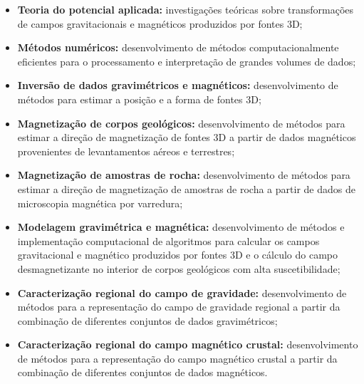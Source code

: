 \begin{itemize}
	
	\item[\parbox{0.03\textwidth}{\vspace{-0.1\baselineskip}\faSearch}] 
	{\textbf{Teoria do potencial aplicada:} investigações teóricas sobre transformações de campos gravitacionais e magnéticos produzidos por fontes 3D;}
	
	\item[\parbox{0.03\textwidth}{\vspace{-0.1\baselineskip}\faSearch}] 
	{\textbf{Métodos numéricos:} desenvolvimento de métodos computacionalmente eficientes para o processamento e interpretação de grandes volumes de dados;}
	
	\item[\parbox{0.03\textwidth}{\vspace{-0.1\baselineskip}\faSearch}] 
	{\textbf{Inversão de dados gravimétricos e magnéticos:} desenvolvimento de métodos para estimar a posição e a forma de fontes 3D;}
	
	\item[\parbox{0.03\textwidth}{\vspace{-0.1\baselineskip}\faSearch}] 
	{\textbf{Magnetização de corpos geológicos:} desenvolvimento de métodos para estimar a direção de magnetização de fontes 3D a partir de dados magnéticos provenientes de levantamentos aéreos e terrestres;}
	
	\item[\parbox{0.03\textwidth}{\vspace{-0.1\baselineskip}\faSearch}] 
	{\textbf{Magnetização de amostras de rocha:} desenvolvimento de métodos para estimar a direção de magnetização de amostras de rocha a partir de dados de microscopia magnética por varredura;}
	
	\item[\parbox{0.03\textwidth}{\vspace{-0.1\baselineskip}\faSearch}] 
	{\textbf{Modelagem gravimétrica e magnética:} desenvolvimento de métodos e implementação computacional de algoritmos para calcular os campos gravitacional e magnético produzidos por fontes 3D e o cálculo do campo desmagnetizante no interior de corpos geológicos com alta suscetibilidade;}
	
	\item[\parbox{0.03\textwidth}{\vspace{-0.1\baselineskip}\faSearch}] 
	{\textbf{Caracterização regional do campo de gravidade:} desenvolvimento de métodos para a representação do campo de gravidade regional a partir da combinação de diferentes conjuntos de dados gravimétricos;}
	
	\item[\parbox{0.03\textwidth}{\vspace{-0.1\baselineskip}\faSearch}] 
	{\textbf{Caracterização regional do campo magnético crustal:} desenvolvimento de métodos para a representação do campo magnético crustal a partir da combinação de diferentes conjuntos de dados magnéticos.}
	
\end{itemize}

